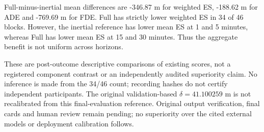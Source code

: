 Full-minus-inertial mean differences are -346.87 m for weighted ES, -188.62 m for ADE and -769.69 m for FDE. Full has strictly lower weighted ES in 34 of 46 blocks. However, the inertial reference has lower mean ES at 1 and 5 minutes, whereas Full has lower mean ES at 15 and 30 minutes. Thus the aggregate benefit is not uniform across horizons.

These are post-outcome descriptive comparisons of existing scores, not a registered component contrast or an independently audited superiority claim. No inference is made from the 34/46 count; recording hashes do not certify independent participants. The original validation-based $\delta=41.100259$ m is not recalibrated from this final-evaluation reference. Original output verification, final cards and human review remain pending; no superiority over the cited external models or deployment calibration follows.
\FloatBarrier

